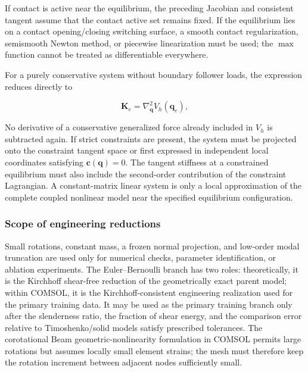 If contact is active near the equilibrium, the preceding Jacobian and consistent tangent assume that the contact active set remains fixed. If the equilibrium lies on a contact opening/closing switching surface, a smooth contact regularization, semismooth Newton method, or piecewise linearization must be used; the \(\max\) function cannot be treated as differentiable everywhere.

For a purely conservative system without boundary follower loads, the expression reduces directly to

\begin{equation}
\label{eq:galerkin-2-114}
\boxed{\mathbf{K}_{e} = \nabla_{\mathbf{q}}^{2}V_{h}\left( \mathbf{q}_{e} \right),}
\end{equation}

No derivative of a conservative generalized force already included in \(V_{h}\) is subtracted again. If strict constraints are present, the system must be projected onto the constraint tangent space or first expressed in independent local coordinates satisfying \(\mathbf{c}\left( \mathbf{q} \right) = 0\). The tangent stiffness at a constrained equilibrium must also include the second-order contribution of the constraint Lagrangian. A constant-matrix linear system is only a local approximation of the complete coupled nonlinear model near the specified equilibrium configuration.\cite{MarsdenRatiu1999MechanicsSymmetry,HairerLubichWanner2006GNI}

\subsubsection{Scope of engineering reductions}\label{sec:galerkin-2-10-2}

Small rotations, constant mass, a frozen normal projection, and low-order modal truncation are used only for numerical checks, parameter identification, or ablation experiments. The Euler--Bernoulli branch has two roles: theoretically, it is the Kirchhoff shear-free reduction of the geometrically exact parent model; within COMSOL, it is the Kirchhoff-consistent engineering realization used for the primary training data. It may be used as the primary training branch only after the slenderness ratio, the fraction of shear energy, and the comparison error relative to Timoshenko/solid models satisfy prescribed tolerances. The corotational Beam geometric-nonlinearity formulation in COMSOL permits large rotations but assumes locally small element strains; the mesh must therefore keep the rotation increment between adjacent nodes sufficiently small\cite{COMSOLBeamInterface2025,COMSOLGeometricNonlinearity2025}.

